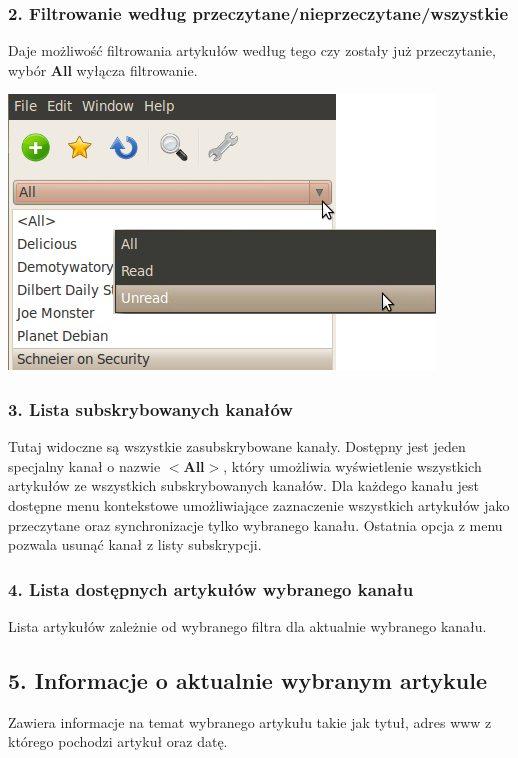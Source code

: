 \documentclass[a4paper,11pt]{report}
\begin{document}
\newpage
\subsubsection*{2. Filtrowanie według przeczytane/nieprzeczytane/wszystkie}
Daje możliwość filtrowania artykułów według tego czy zostały już przeczytanie,
wybór \textbf{All} wyłącza filtrowanie.

\begin{center}
	\includegraphics[scale=0.5]{./img/menu_readmenu1.png}
\end{center}

\subsubsection*{3. Lista subskrybowanych kanałów}
Tutaj widoczne są wszystkie zasubskrybowane kanały. Dostępny jest jeden specjalny kanał o nazwie \textbf{$<$All$>$},
który umożliwia wyświetlenie wszystkich artykułów ze wszystkich subskrybowanych kanałów.
Dla każdego kanału jest dostępne menu kontekstowe umożliwiające zaznaczenie wszystkich artykułów jako przeczytane oraz
synchronizacje tylko wybranego kanału. Ostatnia opcja z menu pozwala usunąć kanał z listy subskrypcji.

\subsubsection*{4. Lista dostępnych artykułów wybranego kanału}
Lista artykułów zależnie od wybranego filtra dla aktualnie wybranego kanału.

\subsection{5. Informacje o aktualnie wybranym artykule}
Zawiera informacje na temat wybranego artykułu takie jak tytuł, adres www z którego pochodzi artykuł oraz datę.
\end{document}
